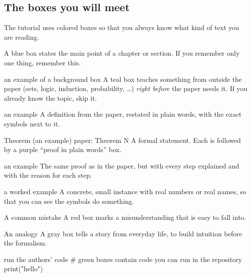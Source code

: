 \subsection*{The boxes you will meet}

The tutorial uses colored boxes so that you always know what kind of text you are reading.

\begin{bigidea}
A blue box states the main point of a chapter or section. If you remember only one thing, remember this.
\end{bigidea}

\begin{toolbox}{an example of a background box}
A teal box teaches something from outside the paper (sets, logic, induction, probability, \dots) \emph{right before} the paper needs it. If you already know the topic, skip it.
\end{toolbox}

\begin{defbox}{an example}
A definition from the paper, restated in plain words, with the exact symbols next to it.
\end{defbox}

\begin{statement}{Theorem (an example) \hfill\normalfont paper: Theorem N}
A formal statement. Each is followed by a purple ``proof in plain words'' box.
\end{statement}

\begin{plainproof}{an example}
The same proof as in the paper, but with every step explained and with the reason for each step.
\end{plainproof}

\begin{example}{a worked example}
A concrete, small instance with real numbers or real names, so that you can see the symbols do something.
\end{example}

\begin{warning}{A common mistake}
A red box marks a misunderstanding that is easy to fall into.
\end{warning}

\begin{story}{An analogy}
A gray box tells a story from everyday life, to build intuition before the formalism.
\end{story}

\begin{tryit}{run the authors' code}
# green boxes contain code you can run in the repository
print("hello")
\end{tryit}

